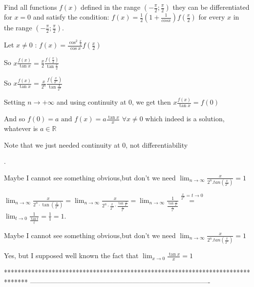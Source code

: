 \begin{solution}
	\begin{tcolorbox}Find all functions $f(x)$ defined in the range $(-\frac{\pi}{2};\frac{\pi}{2})$ they can be differentiated for $x=0$ and satisfy the condition:
$f(x)=\frac{1}{2}(1+\frac{1}{cosx})f(\frac{x}{2})$ for every $x$ in the range $(-\frac{\pi}{2};\frac{\pi}{2})$.\end{tcolorbox}
Let $x\ne 0$ : $f(x)=\frac{\cos^2\frac x2}{\cos x}f(\frac x2)$

So $x\frac{f(x)}{\tan x}=\frac x2\frac{f(\frac x2)}{\tan \frac x2}$

So $x\frac{f(x)}{\tan x}=\frac x{2^n}\frac{f(\frac x{2^n})}{\tan \frac x{2^n}}$

Setting $n\to+\infty$ and using continuity at $0$, we get then $x\frac{f(x)}{\tan x}=f(0)$

And so $\boxed{f(0)=a\text{ and }f(x)=a\frac{\tan x}x}$ $\forall x\ne 0$ which indeed is a solution, whatever is $a\in\mathbb R$
\begin{italicized}Note that we just needed continuity at $0$, not differentiability\end{italicized}.
\end{solution}



\begin{solution}
	Maybe I cannot see something obvious,but don't we need $\lim_{n \to \infty}\frac {x}{2^n.tan(\frac {x}{2^n})} =1$
\end{solution}



\begin{solution}
	$\lim_{n\to\infty}\frac{x}{2^n \cdot \tan \left( \frac{x}{2^n} \right ) } = \lim_{n\to\infty} \frac{x}{2^n \cdot \frac{x}{2^n} \cdot \frac{\tan \frac{x}{2^n}}{\frac{x}{2^n}}}=\lim_{n\to\infty} \frac{1}{\frac{\tan \frac{x}{2^n}}{\frac{x}{2^n}}}\stackrel{\frac{x}{2^n}=t\to 0}=$ $\lim_{t \to 0} \frac{1}{\frac{\tan t}{t}}=\frac{1}{1}=1$.
\end{solution}



\begin{solution}
	\begin{tcolorbox}Maybe I cannot see something obvious,but don't we need $\lim_{n \to \infty}\frac {x}{2^n.tan(\frac {x}{2^n})} =1$\end{tcolorbox}
Yes, but I supposed well known the fact that $\lim_{x\to 0}\frac {\tan x}x=1$
\end{solution}
*******************************************************************************
-------------------------------------------------------------------------------

